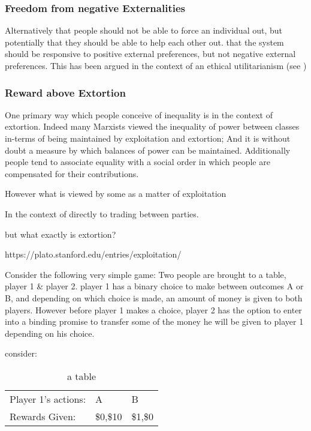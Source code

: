 \subsubsection{Freedom from negative Externalities}

Alternatively that people should not be able to force an individual out, but potentially that they should be able to help each other out.
that the system should be responsive to positive external preferences, but not negative external preferences.
This has been argued in the context of an ethical utilitarianism (see \cite{kymlicka2002contemporary})

\subsubsection{Reward above Extortion}

One primary way which people conceive of inequality is in the context of extortion. Indeed many Marxists viewed the inequality of power between classes in-terms of being maintained by exploitation and extortion; And it is without doubt a measure by which balances of power can be maintained. Additionally people tend to associate equality with a social order in which people are compensated for their contributions.

However what is viewed by some as a matter of exploitation

In the context of directly to trading between parties.

but what exactly is extortion? 

https://plato.stanford.edu/entries/exploitation/


Consider the following very simple game: Two people are brought to a table, player 1 \& player 2. player 1 has a binary choice to make between outcomes A or B, and depending on which choice is made, an amount of money is given to both players.
However before player 1 makes a choice, player 2 has the option to enter into a binding promise to transfer some of the money he will be given to player 1 depending on his choice.

consider:

\begin{table}[h!]
\begin{tabular}{lll}
Player 1's actions: & A   & B   \\
Rewards Given:      & \$0,\$10 & \$1,\$0
\end{tabular}
\caption{a table}
\end{table}

